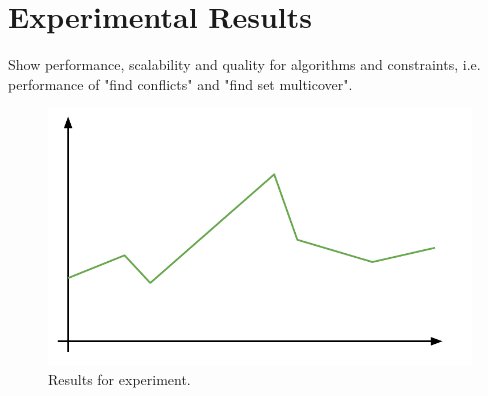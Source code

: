 \section{Experimental Results}
Show performance, scalability and quality for algorithms and constraints, i.e. performance of "find conflicts" and "find set multicover".

\begin{figure}[htbp]
\begin{center}
\includegraphics[scale=.5]{figs/cvl_todo.pdf}
\caption{Results for experiment.}
\label{fig:results-x}
\end{center}
\end{figure}